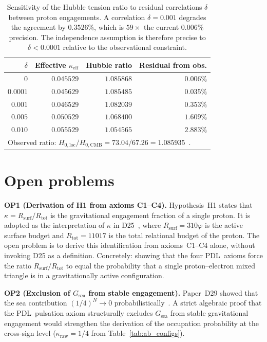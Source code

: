 \documentclass[11pt,a4paper]{article}
\theoremstyle{definition}
\newcommand{\PDL}{\textnormal{PDL}}
\newcommand{\Rsurf}{R_{\mathrm{surf}}}
\newcommand{\Rtot}{R_{\mathrm{tot}}}
\newcommand{\vp}{\varphi}
\newcommand{\kap}{\kappa}
\begin{document}
\begin{table}[ht]
\centering
\caption{Sensitivity of the Hubble tension ratio to residual correlations $\delta$ between proton engagements. A correlation $\delta = 0.001$ degrades the agreement by $0.3526\%$, which is $59\times$ the current $0.006\%$ precision. The independence assumption is therefore precise to $\delta < 0.0001$ relative to the observational constraint.}

\bigskip

\label{tab:hubble_sensitivity}
\begin{tabular}{rrrr}
\toprule
$\delta$ & Effective $\kap_{\mathrm{eff}}$ & Hubble ratio & Residual from obs. \\
\midrule
$0$ & $0.045529$ & $1.085868$ & $0.006\%$ \\
$0.0001$ & $0.045629$ & $1.085485$ & $0.035\%$ \\
$0.001$ & $0.046529$ & $1.082039$ & $0.353\%$ \\
$0.005$ & $0.050529$ & $1.068400$ & $1.609\%$ \\
$0.010$ & $0.055529$ & $1.054565$ & $2.883\%$ \\
\bottomrule
\multicolumn{4}{l}{\small Observed ratio: $H_{0,\mathrm{loc}}/H_{0,\mathrm{CMB}} = 73.04/67.26 = 1.085935$~\cite{Riess2022,N_CMB_PDL_2026}.}
\end{tabular}
\end{table}

\section{Open problems}
\label{sec:open}

\textbf{OP1 (Derivation of H1 from axioms C1--C4).} Hypothesis~H1 states that $\kap = \Rsurf/\Rtot$ is the gravitational engagement fraction of a single proton. It is adopted as the interpretation of $\kap$ in D25~\cite{Effective_Sigma_PDL_2026}, where $\Rsurf = 310\vp$ is the active surface budget and $\Rtot = 11017$ is the total relational budget of the proton. The open problem is to derive this identification from axioms~C1--C4 alone, without invoking D25 as a definition. Concretely: showing that the four \PDL\ axioms force the ratio $\Rsurf/\Rtot$ to equal the probability that a single proton--electron mixed triangle is in a gravitationally active configuration.

\textbf{OP2 (Exclusion of $G_{\mathrm{sea}}$ from stable engagement).} Paper~D29 showed that the sea contribution $(1/4)^N\to 0$ probabilistically~\cite{PDL_D29_2026}. A strict algebraic proof that the \PDL\ pulsation axiom structurally excludes $G_{\mathrm{sea}}$ from stable gravitational engagement would strengthen the derivation of the occupation probability at the cross-sign level ($\kap_{\mathrm{raw}} = 1/4$ from Table~\ref{tab:ab_configs}).
\end{document}
